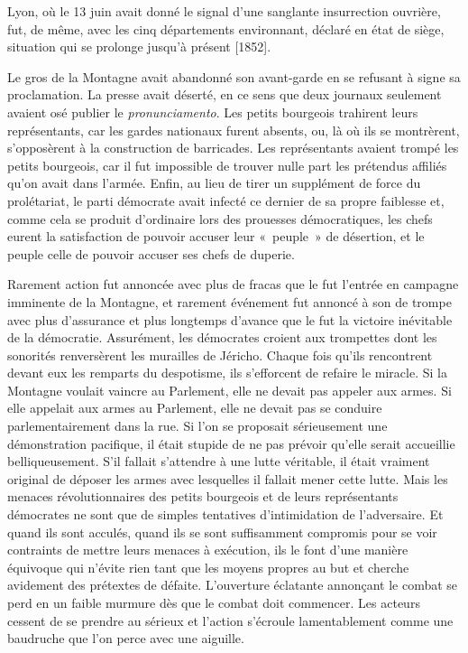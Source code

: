 \documentclass[french,twoside]{book} %
\begin{document}
Lyon, où le 13 juin avait donné le signal d’une sanglante insurrection ouvrière, fut, de même, avec les cinq départements environnant, déclaré en état de siège, situation qui se prolonge jusqu’à présent [1852].\par
Le gros de la Montagne avait abandonné son avant-garde en se refusant à signe sa proclamation. La presse avait déserté, en ce sens que deux journaux seulement avaient osé publier le \emph{pronunciamento}. Les petits bourgeois trahirent leurs représentants, car les gardes nationaux furent absents, ou, là où ils se montrèrent, s’opposèrent à la construction de barricades. Les représentants avaient trompé les petits bourgeois, car il fut impossible de trouver nulle part les prétendus affiliés qu’on avait dans l’armée. Enfin, au lieu de tirer un supplément de force du prolétariat, le parti démocrate avait infecté ce dernier de sa propre faiblesse et, comme cela se produit d’ordinaire lors des prouesses démocratiques, les chefs eurent la satisfaction de pouvoir accuser leur « peuple » de désertion, et le peuple celle de pouvoir accuser ses chefs de duperie.\par
Rarement action fut annoncée avec plus de fracas que le fut l’entrée en campagne imminente de la Montagne, et rarement événement fut annoncé à son de trompe avec plus d’assurance et plus longtemps d’avance que le fut la victoire inévitable de la démocratie. Assurément, les démocrates croient aux trompettes dont les sonorités renversèrent les murailles de Jéricho. Chaque fois qu’ils rencontrent devant eux les remparts du despotisme, ils s’efforcent de refaire le miracle. Si la Montagne voulait vaincre au Parlement, elle ne devait pas appeler aux armes. Si elle appelait aux armes au Parlement, elle ne devait pas se conduire parlementairement dans la rue. Si l’on se proposait sérieusement une démonstration pacifique, il était stupide de ne pas prévoir qu’elle serait accueillie belliqueusement. S’il fallait s’attendre à une lutte véritable, il était vraiment original de déposer les armes avec lesquelles il fallait mener cette lutte. Mais les menaces révolutionnaires des petits bourgeois et de leurs représentants démocrates ne sont que de simples tentatives d’intimidation de l’adversaire. Et quand ils sont acculés, quand ils se sont suffisamment compromis pour se voir contraints de mettre leurs menaces à exécution, ils le font d’une manière équivoque qui n’évite rien tant que les moyens propres au but et cherche avidement des prétextes de défaite. L’ouverture éclatante annonçant le combat se perd en un faible murmure dès que le combat doit commencer. Les acteurs cessent de se prendre au sérieux et l’action s’écroule lamentablement comme une baudruche que l’on perce avec une aiguille.\par
\end{document}
